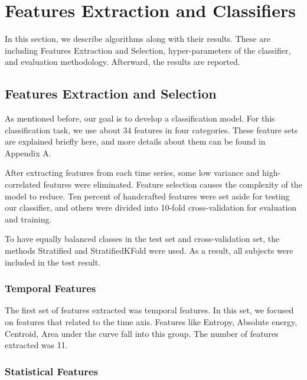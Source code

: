 \section{Features Extraction and Classifiers}

In this section, we describe algorithms along with their results. These are including Features Extraction and Selection, hyper-parameters of the classifier, and evaluation methodology. Afterward, the results are reported.

\subsection{Features Extraction and Selection}

As mentioned before, our goal is to develop a classification model. For this classification task, we use about $34$ features in four categories. These feature sets are explained briefly here, and more details about them can be found in Appendix A.

After extracting features from each time series, some low variance and high-correlated features were eliminated. Feature selection causes the complexity of the model to reduce. Ten percent of handcrafted features were set aside for testing our classifier, and others were divided into 10-fold cross-validation for evaluation and training. 

To have equally balanced classes in the test set and cross-validation set, the methods Stratified and StratifiedKFold were used. As a result, all subjects were included in the test result. %

\subsubsection{Temporal Features}

The first set of features extracted was temporal features. In this set, we focused on features that related to the time axis. Features like Entropy, Absolute energy, Centroid, Area under the curve fall into this group. The number of features extracted was 11.

\subsubsection{Statistical Features}

